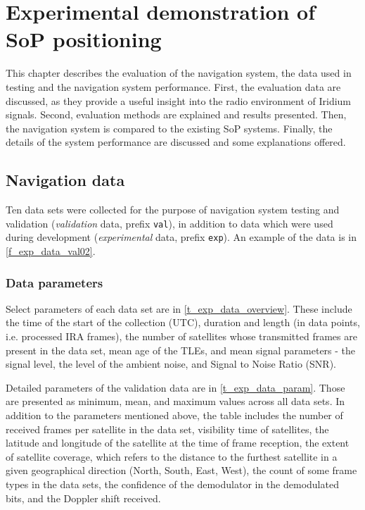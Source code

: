 \chapter{Experimental demonstration of SoP positioning}
\label{s_exp}
This chapter describes the evaluation of the navigation system, the data used in testing and the navigation system performance. First, the evaluation data are discussed, as they provide a useful insight into the radio environment of Iridium signals. Second, evaluation methods are explained and results presented. Then, the navigation system is compared to the existing SoP systems. Finally, the details of the system performance are discussed and some explanations offered.

\section{Navigation data}
Ten data sets were collected for the purpose of navigation system testing and validation (\textit{validation} data, prefix \texttt{val}), in addition to data which were used during development (\textit{experimental} data, prefix \texttt{exp}). An example of the data is in \autoref{f_exp_data_val02}.


\subsection{Data parameters}
Select parameters of each data set are in \autoref{t_exp_data_overview}. These include the time of the start of the collection (UTC), duration and length (in data points, i.e. processed IRA frames), the number of satellites whose transmitted frames are present in the data set, mean age of the TLEs, and mean signal parameters - the signal level, the level of the ambient noise, and Signal to Noise Ratio (SNR). 

Detailed parameters of the validation data are in \autoref{t_exp_data_param}. Those are presented as minimum, mean, and maximum values across all data sets. In addition to the parameters mentioned above, the table includes the number of received frames per satellite in the data set, visibility time of satellites, the latitude and longitude of the satellite at the time of frame reception, the extent of satellite coverage, which refers to the distance to the furthest satellite in a given geographical direction (North, South, East, West), the count of some frame types in the data sets, the confidence of the demodulator in the demodulated bits, and the Doppler shift received.

